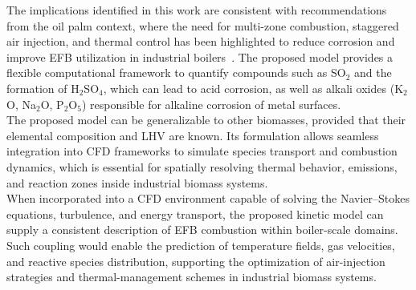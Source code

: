 \documentclass[preprint,12pt]{elsarticle}
\begin{document}
{%

The implications identified in this work are consistent with recommendations from the oil palm context, where the need for multi-zone combustion, staggered air injection, and thermal control has been highlighted to reduce corrosion and improve EFB utilization in industrial boilers~\cite{BayonaRaquis}. The proposed model provides a flexible computational framework to quantify compounds such as SO$_2$ and the formation of H$_2$SO$_4$, which can lead to acid corrosion, as well as alkali oxides (K$_2$O, Na$_2$O, P$_2$O$_5$) responsible for alkaline corrosion of metal surfaces.\\

The proposed model can be generalizable to other biomasses, provided that their elemental composition and LHV are known. Its formulation allows seamless integration into CFD frameworks to simulate species transport and combustion dynamics, which is essential for spatially resolving thermal behavior, emissions, and reaction zones inside industrial biomass systems.\\


When incorporated into a CFD environment capable of solving the Navier–Stokes equations, turbulence, and energy transport, the proposed kinetic model can supply a consistent description of EFB combustion within boiler-scale domains. Such coupling would enable the prediction of temperature fields, gas velocities, and reactive species distribution, supporting the optimization of air-injection strategies and thermal-management schemes in industrial biomass systems.\\

}
\end{document}
